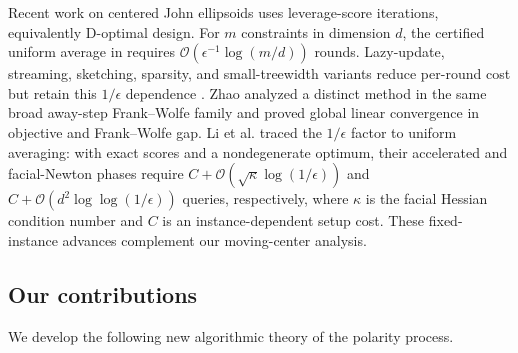 \documentclass[smallextended]{svjour3}
\begin{document}
Recent work on centered John ellipsoids uses leverage-score iterations,
equivalently D-optimal design. For $m$ constraints in dimension $d$, the
certified uniform average in \cite{CohenCousinsLeeYang2019} requires
$\mathcal{O}(\epsilon^{-1}\log(m/d))$ rounds. Lazy-update, streaming, sketching,
sparsity, and small-treewidth variants reduce per-round cost but retain this
$1/\epsilon$ dependence \cite{WoodruffYasuda2024,CaoLiSongYangZhou2025}. Zhao \cite{Zhao2025AwayStep}
analyzed a distinct method in the same broad away-step Frank--Wolfe
family and proved global linear convergence in objective and Frank--Wolfe gap. Li et al. \cite{LiYuJiangGaoHan2026} traced the $1/\epsilon$ factor to uniform
averaging: with exact scores and a nondegenerate optimum, their accelerated and
facial-Newton phases require $C+\mathcal{O}(\sqrt{\kappa}\log(1/\epsilon))$
and $C+\mathcal{O}(d^2\log\log(1/\epsilon))$ queries, respectively, where 
$\kappa$ is the facial Hessian condition number and $C$ is an instance-dependent setup cost.
These fixed-instance advances complement our moving-center analysis.


\subsection{Our contributions}
We develop the following new algorithmic theory of the polarity process.
\end{document}
